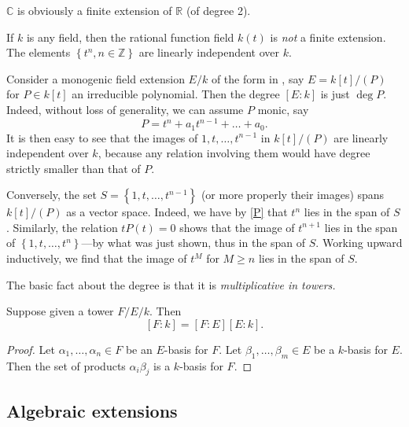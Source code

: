 \begin{example} 
$\mathbb{C}$ is obviously a finite extension of $\mathbb{R}$ (of degree 2).
\end{example} 

\begin{example} 
If $k$ is any field, then the rational function field $k(t)$ is \emph{not} a
finite extension. The elements $\left\{t^n, n \in \mathbb{Z}\right\}$
are linearly independent over $k$.
\end{example} 

\begin{example} 
Consider a monogenic  field extension $E/k$ of the form in
, say $E = k[t]/(P)$ for $P \in k[t]$ an irreducible
polynomial.
Then the degree $[E:k]$ is just $\deg P$. 
Indeed, without loss of generality, we can assume $P$ monic, say
\begin{equation} \label{P} P = t^n + a_1 t^{n-1} + \dots + a_0.\end{equation}
It is then easy to see that the images of $1, t, \dots, t^{n-1}$ in
$k[t]/(P)$ are linearly
independent over $k$, because any relation involving them would have
degree strictly smaller than that of $P$.

Conversely, the set $S=\left\{1, t, \dots, t^{n-1}\right\}$ (or more
properly their images) spans $k[t]/(P)$ as a vector space.
Indeed, we have by \eqref{P} that $t^n$ lies in the span of $S$.
Similarly, the relation $tP(t)=0$ shows that the image of  $t^{n+1}$ lies in the span of
$\left\{1, t, \dots, t^n\right\}$---by what was just shown, thus in the span of
$S$. Working upward inductively, we find
that the image of $t^M$ for $M  \geq n$ lies in the span of $S$.
\end{example} 


The basic fact about the degree is that it is \emph{multiplicative in
towers.}

\begin{proposition} 
Suppose given a tower $F/E/k$. Then
\[ [F:k] = [F:E][E:k].  \]
\end{proposition} 
\begin{proof} 
Let $\alpha_1, \dots, \alpha_n \in F$ be an $E$-basis for $F$. Let $\beta_1,
\dots, \beta_m \in E$ be a $k$-basis for $E$. Then 
the set of products $\alpha_i \beta_j$ is a $k$-basis for $F$.
\end{proof} 

\subsection{Algebraic extensions}

